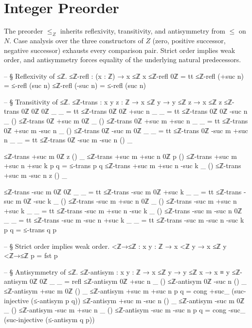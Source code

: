 \documentclass[11pt,a4paper]{book}
\def\mathbb#1{#1}%
\begin{document}
\section{Integer Preorder}

The preorder $\le_{\mathbb{Z}}$ inherits reflexivity, transitivity, and antisymmetry from $\le$ on $\mathbb{N}$.
Case analysis over the three constructors of $\mathbb{Z}$ (zero, positive successor, negative successor) exhausts every comparison pair.
Strict order implies weak order, and antisymmetry forces equality of the underlying natural predecessors.

\begin{code}
-- § Reflexivity of ≤ℤ.
≤ℤ-refl : (x : ℤ) → x ≤ℤ x
≤ℤ-refl 0ℤ = tt
≤ℤ-refl (+suc n) = ≤-refl (suc n)
≤ℤ-refl (-suc n) = ≤-refl (suc n)

-- § Transitivity of ≤ℤ.
≤ℤ-trans : {x y z : ℤ} → x ≤ℤ y → y ≤ℤ z → x ≤ℤ z
≤ℤ-trans {0ℤ} {0ℤ} {0ℤ} _ _ = tt
≤ℤ-trans {0ℤ} {0ℤ} {+suc n} _ _ = tt
≤ℤ-trans {0ℤ} {0ℤ} { -suc n } _ ()
≤ℤ-trans {0ℤ} {+suc m} {0ℤ} _ ()
≤ℤ-trans {0ℤ} {+suc m} {+suc n} _ _ = tt
≤ℤ-trans {0ℤ} {+suc m} { -suc n } _ ()
≤ℤ-trans {0ℤ} { -suc m } {0ℤ} _ _ = tt
≤ℤ-trans {0ℤ} { -suc m } {+suc n} _ _ = tt
≤ℤ-trans {0ℤ} { -suc m } { -suc n } () _

≤ℤ-trans {+suc m} {0ℤ} {z} () _
≤ℤ-trans {+suc m} {+suc n} {0ℤ} p ()
≤ℤ-trans {+suc m} {+suc n} {+suc k} p q = ≤-trans p q
≤ℤ-trans {+suc m} {+suc n} { -suc k } _ ()
≤ℤ-trans {+suc m} { -suc n } {z} () _

≤ℤ-trans { -suc m } {0ℤ} {0ℤ} _ _ = tt
≤ℤ-trans { -suc m } {0ℤ} {+suc k} _ _ = tt
≤ℤ-trans { -suc m } {0ℤ} { -suc k } _ ()
≤ℤ-trans { -suc m } {+suc n} {0ℤ} _ ()
≤ℤ-trans { -suc m } {+suc n} {+suc k} _ _ = tt
≤ℤ-trans { -suc m } {+suc n} { -suc k } _ ()
≤ℤ-trans { -suc m } { -suc n } {0ℤ} _ _ = tt
≤ℤ-trans { -suc m } { -suc n } {+suc k} _ _ = tt
≤ℤ-trans { -suc m } { -suc n } { -suc k } p q = ≤-trans q p

-- § Strict order implies weak order.
<ℤ→≤ℤ : {x y : ℤ} → x <ℤ y → x ≤ℤ y
<ℤ→≤ℤ p = fst p

-- § Antisymmetry of ≤ℤ.
≤ℤ-antisym : {x y : ℤ} → x ≤ℤ y → y ≤ℤ x → x ≡ y
≤ℤ-antisym {0ℤ} {0ℤ} _ _ = refl
≤ℤ-antisym {0ℤ} {+suc n} _ ()
≤ℤ-antisym {0ℤ} { -suc n } () _
≤ℤ-antisym {+suc m} {0ℤ} () _
≤ℤ-antisym {+suc m} {+suc n} p q = cong +suc_ (suc-injective (≤-antisym p q))
≤ℤ-antisym {+suc m} { -suc n } () _
≤ℤ-antisym { -suc m } {0ℤ} _ ()
≤ℤ-antisym { -suc m } {+suc n} _ ()
≤ℤ-antisym { -suc m } { -suc n } p q = cong -suc_ (suc-injective (≤-antisym q p))
\end{code}
\end{document}

